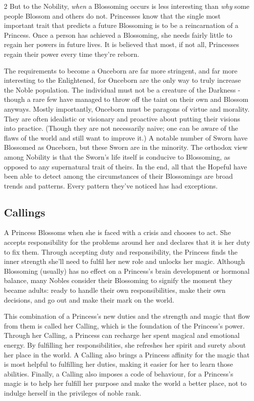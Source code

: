 \begin{multicols}{2}
But to the Nobility, \textit{when} a Blossoming occurs is less interesting than \textit{why} some people Blossom and others do not. Princesses know that the single most important trait that predicts a future Blossoming is to be a reincarnation of a Princess. Once a person has achieved a Blossoming, she needs fairly little to regain her powers in future lives. It is believed that most, if not all, Princesses regain their power every time they're reborn. 

The requirements to become a Onceborn are far more stringent, and far more interesting to the Enlightened, for Onceborn are the only way to truly increase the Noble population. The individual must not be a creature of the Darkness - though a rare few have managed to throw off the taint on their own and Blossom anyways. Mostly importantly, Onceborn must be paragons of virtue and morality. They are often idealistic or visionary and proactive about putting their visions into practice. (Though they are not necessarily naive; one can be aware of the flaws of the world and still want to improve it.) A notable number of Sworn have Blossomed as Onceborn, but these Sworn are in the minority. The orthodox view among Nobility is that the Sworn's life itself is conducive to Blossoming, as opposed to any supernatural trait of theirs. In the end, all that the Hopeful have been able to detect among the circumstances of their Blossomings are broad trends and patterns. Every pattern they've noticed has had exceptions. 


\subsection*{Callings}

A Princess Blossoms when she is faced with a crisis and chooses to act. She accepts responsibility for the problems around her and declares that it is her duty to fix them. Through accepting duty and responsibility, the Princess finds the inner strength she'll need to fulfil her new role and unlocks her magic. Although Blossoming (usually) has no effect on a Princess's brain development or hormonal balance, many Nobles consider their Blossoming to signify the moment they became adults: ready to handle their own responsibilities, make their own decisions, and go out and make their mark on the world. 

This combination of a Princess's new duties and the strength and magic that flow from them is called her Calling, which is the foundation of the Princess's power. Through her Calling, a Princess can recharge her spent magical and emotional energy. By fulfilling her responsibilities, she refreshes her spirit and surety about her place in the world. A Calling also brings a Princess affinity for the magic that is most helpful to fulfilling her duties, making it easier for her to learn those abilities. Finally, a Calling also imposes a code of behaviour, for a Princess's magic is to help her fulfill her purpose and make the world a better place, not to indulge herself in the privileges of noble rank.


\end{multicols}

